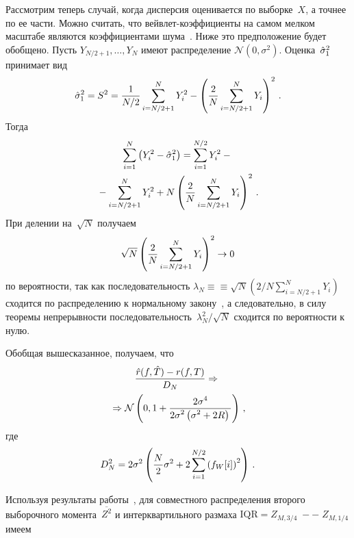 \begin{multicols}{2}
Рассмотрим теперь случай, когда дисперсия оценивается по выборке~$X$, а точнее по ее части. 
Можно считать, что вейвлет-коэффициенты на самом мелком масштабе являются коэффициентами шума~\cite{2mar}. 
Ниже это предположение будет обобщено. Пусть $Y_{N/2+1},\ldots,Y_N$ имеют распределение 
$\mathcal{N}\left(0,\sigma^2\right)$. Оценка~$\hat\sigma^2_1$ принимает вид
\begin{equation*}
\hat\sigma^2_1=S^2=\displaystyle\frac{\displaystyle 1\mathstrut}{\displaystyle N/2\mathstrut}\sum\limits_{i=N/2+1}^N Y_i^2-\left(\displaystyle\frac{\displaystyle 2\mathstrut}{\displaystyle N\mathstrut}\sum\limits_{i=N/2+1}^N Y_i\right)^2\,.
\end{equation*}
Тогда
\begin{multline*}
\sum\limits_{i=1}^N \left(Y_i^2-\hat\sigma^2_1\right)=
\sum\limits_{i=1}^{N/2} Y_i^2 -{}\\
{}- \sum\limits_{i=N/2+1}^N Y_i^2 + N\left(\displaystyle\frac{\displaystyle 2\mathstrut}{\displaystyle N\mathstrut}\sum\limits_{i=N/2+1}^N Y_i\right)^2\,.
\end{multline*}
При делении на~$\sqrt{N}$ получаем
\begin{equation*}
\sqrt{N}\left(\displaystyle\frac{\displaystyle 2\mathstrut}{\displaystyle N\mathstrut}\sum\limits_{i=N/2+1}^N Y_i\right)^2 \rightarrow 0
\end{equation*}
по вероятности, так как последовательность $\lambda_N\equiv$\linebreak $\equiv \sqrt{N}\left(2/N\sum_{i=N/2+1}^N Y_i\right)$ 
сходится по распределению к нормальному закону~\cite{8mar}, а следовательно, в силу теоремы 
непрерывности последовательность~$\lambda_N^2/\sqrt{N}$ сходится по вероятности к нулю.

Обобщая вышесказанное, получаем, что
\begin{multline}
\label{eq_weaklimriskS2}
\displaystyle\frac{\displaystyle \hat{r}(f,\hat{T})-r(f,T)\mathstrut}{\displaystyle D_N\mathstrut}\Rightarrow{}\\
{}\Rightarrow \mathcal{N}\left(0,1+\displaystyle\frac{\displaystyle 2\sigma^4\mathstrut}{\displaystyle 2\sigma^2\left(\sigma^2+2R\right)\mathstrut}\right)\,,
\end{multline}
где
\begin{equation}
\label{eq_DNforS2}
D_N^2=2\sigma^2\left(\displaystyle\frac{\displaystyle N\mathstrut}{\displaystyle 2\mathstrut}\sigma^2+2\sum_{i=1}^{N/2} \left(f_W[i]\right)^2\right)\,.
\end{equation}

Используя результаты работы~\cite{11mar}, для совместного распределения второго выборочного момента~$\overline{Z^2}$ 
и интерквартильного размаха $\mathrm{IQR}=Z_{M,3/4}\;-$\linebreak $-\;Z_{M,1/4}$ имеем


\end{multicols}
